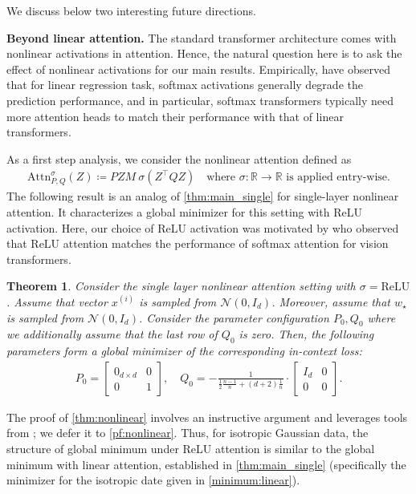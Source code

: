 \documentclass{article}
\newcommand{\R}{\mathbb{R}}
\newtheorem{theorem}{Theorem}
\newcommand{\atth}{\mathrm{Attn}^\sigma}
\newcommand{\wstar}{w_\star}
\newcommand{\tx}[1]{x^{(#1)}}
\begin{document}
 
We discuss below two interesting future directions.

\textbf{Beyond linear attention.} The standard transformer architecture comes with nonlinear activations in attention. Hence, the natural question here is to ask the effect of nonlinear activations for our main results. Empirically, \cite{von2022transformers} have observed that for linear regression task, softmax activations  generally degrade the prediction performance, and in particular, softmax transformers typically need more attention heads to match their performance with that of linear transformers. 

As a first step analysis, we consider the nonlinear attention defined as 
\begin{align}
    \atth_{P,Q}(Z) \coloneqq  P ZM \  \sigma (Z^\top Q Z)\quad \text{where }\sigma :\R\to \R \text{ is applied entry-wise.}
\end{align}  
The following result is an analog of \autoref{thm:main_single} for single-layer nonlinear attention. It characterizes a global minimizer for this setting with ReLU activation.
Here, our choice of ReLU activation was motivated by \cite{wortsman2023replacing} who observed that ReLU attention matches the performance of softmax attention for vision transformers. 

\begin{theorem} \label{thm:nonlinear} 
Consider the single layer nonlinear attention setting with  $\sigma = \mathrm{ReLU}$.
Assume that vector $\tx{i}$ is sampled from $\mathcal{N}(0, I_{d})$. 
Moreover, assume that  $\wstar$ is sampled  from $\mathcal{N}(0, I_d)$.  
Consider the parameter configuration $P_0,Q_0$  where we additionally assume that the last row of $Q_0$ is zero. 
Then, the following parameters form a global minimizer of the corresponding in-context loss:
    \begin{align}  
P_0 = \begin{bmatrix}
0_{d\times d} & 0 \\ 
0 & 1 
\end{bmatrix} ,\quad Q_0 = -\frac{1}{\frac{1}{2}\frac{n-1}{n}+(d+2)\frac{1}{n}} \cdot \begin{bmatrix}
 I_d & 0\\
0  & 0
\end{bmatrix} .
\end{align} 
\end{theorem}
The proof of \autoref{thm:nonlinear}  involves an instructive argument and leverages tools from \citep{erdogdu2016scaled}; we defer it to \autoref{pf:nonlinear}. Thus, for isotropic Gaussian data, the structure of global minimum under ReLU attention is similar to the global minimum with linear attention, established in \autoref{thm:main_single} (specifically the minimizer for the isotropic date given in \eqref{minimum:linear}). 
\end{document}
